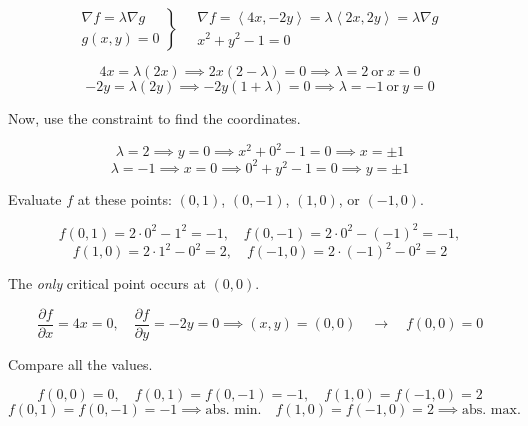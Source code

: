 \documentclass{article}
\begin{document}
\[
\left.
\begin{array}{ll}
\displaystyle\nabla f =\lambda \nabla g \\
\displaystyle g(x,y) = 0
\end{array}
\right\}\quad
\begin{array}{ll}
\nabla f=\left\langle4x,-2y\right\rangle = \lambda\left\langle2x,2y\right\rangle = \lambda\nabla g \\[0.1cm] x^2+y^2-1=0
\end{array}
\]

\[4x=\lambda(2x)\implies2x(2-\lambda)=0\implies\lambda=2\:\text{or}\:x=0\]
\[-2y=\lambda(2y)\implies-2y(1+\lambda)=0\implies\lambda=-1\:\text{or}\:y=0\]

Now, use the constraint to find the coordinates.

\[\lambda=2\implies y=0\implies x^2+0^2-1=0\implies x=\pm1\]
\[\lambda=-1\implies x=0\implies 0^2+y^2-1=0\implies y=\pm1\]

Evaluate $f$ at these points: $(0,1)$, $(0,-1)$, $(1,0)$, or $(-1,0)$.

\[f(0,1)=2\cdot0^2-1^2=-1,\quad f(0,-1) =2\cdot0^2-(-1)^2=-1,\]
\[f(1,0)=2\cdot1^2-0^2=2,\quad f(-1,0)=2\cdot(-1)^2-0^2=2\]

The \textit{only} critical point occurs at $(0,0)$.

\[\frac{\partial f}{\partial x}=4x=0,\quad\frac{\partial f}{\partial y}=-2y=0\implies(x,y)=(0,0)\quad\rightarrow\quad f(0,0)=0\]

Compare all the values.

\[f(0,0)=0,\quad f(0,1)=f(0,-1)=-1,\quad f(1,0)=f(-1,0)=2\]
\[\boxed{f(0,1)=f(0,-1)=-1\implies\text{abs. min.}\quad f(1,0)=f(-1,0)=2\implies\text{abs. max.}}\]

\vspace{1em}
\end{document}
